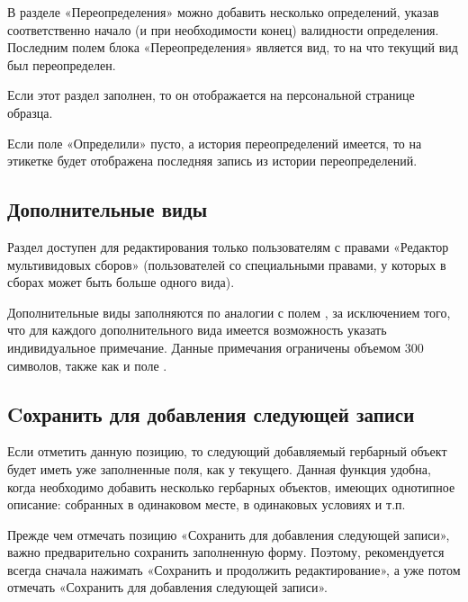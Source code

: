 \documentclass[letterpaper,10pt,russian]{sphinxmanual}
\begin{document}
В разделе «Переопределения» можно добавить несколько определений,
указав соответственно начало (и при необходимости конец) валидности
определения. Последним полем блока «Переопределения» является вид,
то на что текущий вид был переопределен.

Если этот раздел заполнен, то он отображается на персональной странице образца.

Если поле «Определили» пусто, а история переопределений имеется,
то на этикетке будет отображена последняя запись из истории переопределений.

\ignorespaces 

\subsection{Дополнительные виды}
\label{\detokenize{main:index-34}}\label{\detokenize{main:id38}}
Раздел доступен для редактирования только пользователям с правами
«Редактор мультивидовых сборов» (пользователей со специальными правами,
у которых в сборах может быть больше одного вида).

Дополнительные виды заполняются по аналогии с полем {\hyperref[\detokenize{main:id37}]{}},
за исключением того, что  для каждого дополнительного вида имеется
возможность указать индивидуальное примечание.
Данные примечания ограничены объемом 300 символов,
также как и поле {\hyperref[\detokenize{main:id16}]{}}.

\ignorespaces 

\subsection{Cохранить для добавления следующей записи}
\label{\detokenize{main:index-35}}\label{\detokenize{main:c}}
Если отметить данную позицию, то следующий добавляемый
гербарный объект будет иметь
уже заполненные поля, как у текущего. Данная функция удобна,
когда необходимо добавить
несколько гербарных объектов, имеющих однотипное описание:
собранных в одинаковом месте, в одинаковых условиях и т.п.

Прежде чем отмечать позицию «Сохранить для добавления следующей записи»,
важно предварительно сохранить
заполненную форму. Поэтому, рекомендуется всегда сначала нажимать
«Сохранить и продолжить редактирование», а уже потом
отмечать «Сохранить для добавления следующей записи».
\end{document}
